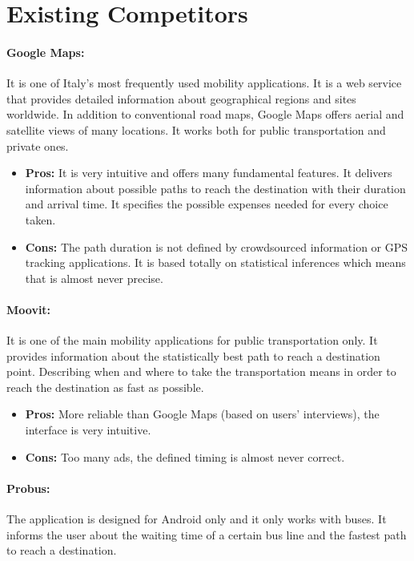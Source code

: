 \documentclass[a4paper, 11pt]{report}
\begin{document}
\section{Existing Competitors}\label{sec:existing-competitors}

\paragraph{Google Maps:} It is one of Italy's most frequently used mobility applications. It is a web service that provides detailed information about geographical regions and sites worldwide. In addition to conventional road maps, Google Maps offers aerial and satellite views of many locations. It works both for public transportation and private ones.
\begin{itemize}
	\item \textbf{Pros:} It is very intuitive and offers many fundamental features. It delivers information about possible paths to reach the destination with their duration and arrival time. It specifies the possible expenses needed for every choice taken.
	\item \textbf{Cons:} The path duration is not defined by crowdsourced information or GPS tracking applications. It is based totally on statistical inferences which means that is almost never precise.
\end{itemize}

\paragraph{Moovit:}  It is one of the main mobility applications for public transportation only. It provides information about the statistically best path to reach a destination point. Describing when and where to take the transportation means in order to reach the destination as fast as possible.

\begin{itemize}
	\item \textbf{Pros:} More reliable than Google Maps (based on users' interviews), the interface is very intuitive.
	\item \textbf{Cons:} Too many ads, the defined timing is almost never correct.
\end{itemize}

\paragraph{Probus:}The application is designed for Android only and it only works with buses. It informs the user about the waiting time of a certain bus line and the fastest path to reach a destination.
\end{document}
